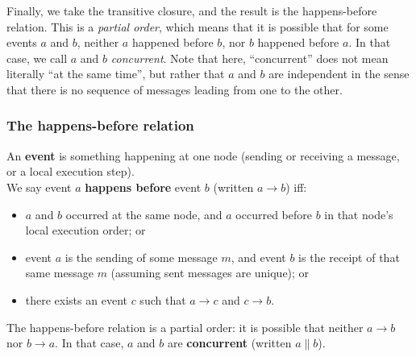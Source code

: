 Finally, we take the transitive closure, and the result is the happens-before relation.
This is a \emph{partial order}, which means that it is possible that for some events $a$ and $b$, neither $a$ happened before $b$, nor $b$ happened before $a$.
In that case, we call $a$ and $b$ \emph{concurrent}.
Note that here, ``concurrent'' does not mean literally ``at the same time'', but rather that $a$ and $b$ are independent in the sense that there is no sequence of messages leading from one to the other.

\begin{frame}
    \label{s:happens-before}
    \frametitle{The happens-before relation}
    An \textbf{event} is something happening at one node (sending or receiving a message, or a local execution step).\\[1em]
    We say event $a$ \textbf{happens before} event $b$ (written $a \rightarrow b$) iff:\pause
    \begin{itemize}
        \item $a$ and $b$ occurred at the same node, and $a$ occurred before $b$ in that node's local execution order; or\pause
        \item event $a$ is the sending of some message $m$, and event $b$ is the receipt of that same message $m$ (assuming sent messages are unique); or\pause
        \item there exists an event $c$ such that $a \rightarrow c$ and $c \rightarrow b$.\\[1em]\pause
    \end{itemize}
    The happens-before relation is a partial order:
    it is possible that neither $a \rightarrow b$ nor $b \rightarrow a$.
    In that case, $a$ and $b$ are \textbf{concurrent} (written $a \parallel b$).
\end{frame}
\label{l:happens-before}

